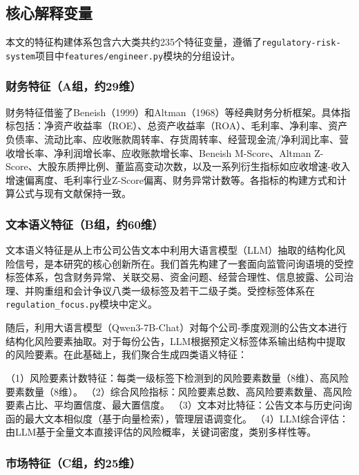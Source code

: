 \subsection{核心解释变量}

本文的特征构建体系包含六大类共约235个特征变量，遵循了\texttt{regulatory-risk-system}项目中\texttt{features/engineer.py}模块的分组设计。

\subsubsection{财务特征（A组，约29维）}

财务特征借鉴了Beneish（1999）和Altman（1968）等经典财务分析框架。具体指标包括：净资产收益率（ROE）、总资产收益率（ROA）、毛利率、净利率、资产负债率、流动比率、应收账款周转率、存货周转率、经营现金流/净利润比率、营收增长率、净利润增长率、应收账款增长率、Beneish M-Score、Altman Z-Score、大股东质押比例、董监高变动次数，以及一系列衍生指标如应收增速-收入增速偏离度、毛利率行业Z-Score偏离、财务异常计数等。各指标的构建方式和计算公式与现有文献保持一致。

\subsubsection{文本语义特征（B组，约60维）}

文本语义特征是从上市公司公告文本中利用大语言模型（LLM）抽取的结构化风险信号，是本研究的核心创新所在。我们首先构建了一套面向监管问询语境的受控标签体系，包含财务异常、关联交易、资金问题、经营合理性、信息披露、公司治理、并购重组和会计争议八类一级标签及若干二级子类。受控标签体系在\texttt{regulation\_focus.py}模块中定义。

随后，利用大语言模型（Qwen3-7B-Chat）对每个公司-季度观测的公告文本进行结构化风险要素抽取。对于每份公告，LLM根据预定义标签体系输出结构中提取的风险要素。在此基础上，我们聚合生成四类语义特征：

（1）风险要素计数特征：每类一级标签下检测到的风险要素数量（8维）、高风险要素数量（8维）。
（2）综合风险指标：风险要素总数、高风险要素数量、高风险要素占比、平均置信度、最大置信度。
（3）文本对比特征：公告文本与历史问询函的最大文本相似度（基于向量检索），管理层语调变化。
（4）LLM综合评估：由LLM基于全量文本直接评估的风险概率，关键词密度，类别多样性等。

\subsubsection{市场特征（C组，约25维）}

